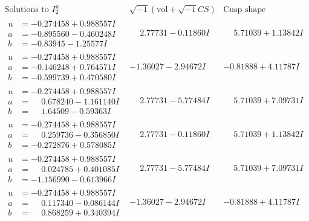 \documentclass[1p]{elsarticle_modified}
\theoremstyle{definition}
\newcommand{\I}{\sqrt{-1}}
\begin{document}
$$\begin{array}{c|c|c}  
\text{Solutions to }I^u_{2}& \I (\text{vol} + \sqrt{-1}CS) & \text{Cusp shape}\\
 \hline 
\begin{aligned}
u &= -0.274458 + 0.988557 I \\
a &= -0.895560 - 0.460248 I \\
b &= -0.83945 - 1.25577 I\end{aligned}
 & \phantom{-}2.77731 - 0.11860 I & \phantom{-}5.71039 + 1.13842 I \\ \hline\begin{aligned}
u &= -0.274458 + 0.988557 I \\
a &= -0.146248 + 0.764571 I \\
b &= -0.599739 + 0.470580 I\end{aligned}
 & -1.36027 - 2.94672 I & -0.81888 + 4.11787 I \\ \hline\begin{aligned}
u &= -0.274458 + 0.988557 I \\
a &= \phantom{-}0.678240 - 1.161140 I \\
b &= \phantom{-}1.64509 - 0.59363 I\end{aligned}
 & \phantom{-}2.77731 - 5.77484 I & \phantom{-}5.71039 + 7.09731 I \\ \hline\begin{aligned}
u &= -0.274458 + 0.988557 I \\
a &= \phantom{-}0.259736 - 0.356850 I \\
b &= -0.272876 + 0.578085 I\end{aligned}
 & \phantom{-}2.77731 - 0.11860 I & \phantom{-}5.71039 + 1.13842 I \\ \hline\begin{aligned}
u &= -0.274458 + 0.988557 I \\
a &= \phantom{-}0.024785 + 0.401085 I \\
b &= -1.156990 - 0.613966 I\end{aligned}
 & \phantom{-}2.77731 - 5.77484 I & \phantom{-}5.71039 + 7.09731 I \\ \hline\begin{aligned}
u &= -0.274458 + 0.988557 I \\
a &= \phantom{-}0.117340 - 0.086144 I \\
b &= \phantom{-}0.868259 + 0.340394 I\end{aligned}
 & -1.36027 - 2.94672 I & -0.81888 + 4.11787 I \\ \hline\begin{aligned}

\end{aligned}
\end{array}$$
\end{document}
